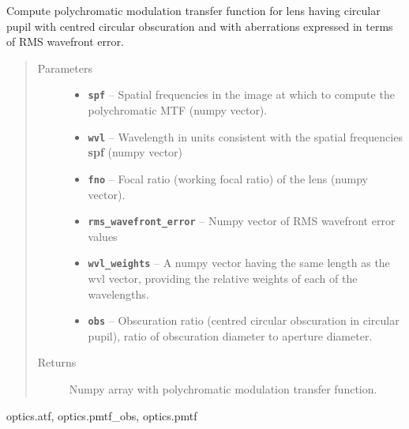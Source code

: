 \documentclass[a4paper,10pt,english]{sphinxmanual}
\begin{document}
\begin{fulllineitems}
\label{packages:optics.pmtf_obs_wfe}
Compute polychromatic modulation transfer function for lens having circular pupil with centred circular
obscuration and with aberrations expressed in terms of RMS wavefront error.
\begin{quote}\begin{description}
\item[{Parameters}] \leavevmode\begin{itemize}
\item {} 
\textbf{\texttt{spf}} -- Spatial frequencies in the image at which to compute the polychromatic MTF (numpy vector).

\item {} 
\textbf{\texttt{wvl}} -- Wavelength in units consistent with the spatial frequencies \textbf{spf} (numpy vector)

\item {} 
\textbf{\texttt{fno}} -- Focal ratio (working focal ratio) of the lens (numpy vector).

\item {} 
\textbf{\texttt{rms\_wavefront\_error}} -- Numpy vector of RMS wavefront error values

\item {} 
\textbf{\texttt{wvl\_weights}} -- A numpy vector having the same length as the wvl vector, providing the relative weights of each
of the wavelengths.

\item {} 
\textbf{\texttt{obs}} -- Obscuration ratio (centred circular obscuration in circular pupil), ratio of obscuration diameter to
aperture diameter.

\end{itemize}

\item[{Returns}] \leavevmode
Numpy array with polychromatic modulation transfer function.

\end{description}\end{quote}




optics.atf, optics.pmtf\_obs, optics.pmtf



\end{fulllineitems}
\end{document}
